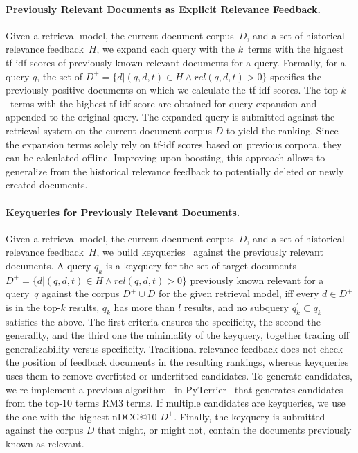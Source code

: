 \paragraph{Previously Relevant Documents as Explicit Relevance Feedback.} Given a retrieval model, the current document corpus~$D$, and a set of historical relevance feedback~$H$, we expand each query with the $k$~terms with the highest tf-idf scores of previously known relevant documents for a query. Formally, for a query $q$, the set of $D^{+} = \{d| (q,d,t) \in H \wedge rel(q,d,t) > 0\}$ specifies the previously positive documents on which we calculate the tf-idf scores. The top $k$~terms with the highest tf-idf score are obtained for query expansion and appended to the original query. The expanded query is submitted against the retrieval system on the current document corpus $D$ to yield the ranking. Since the expansion terms solely rely on tf-idf scores based on  previous corpora, they can be calculated offline. Improving upon boosting, this approach allows to generalize from the historical relevance feedback to potentially deleted or newly created documents. 


\paragraph{Keyqueries for Previously Relevant Documents.} Given a retrieval model, the current document corpus~$D$, and a set of historical relevance feedback~$H$, we build keyqueries~\cite{froebe:2021c,gollub:2013a,hagen:2016b} against the previously relevant documents. A query $q_{k}$ is a keyquery for the set of target documents $D^{+} = \{d| (q,d,t) \in H \wedge rel(q,d,t) > 0\}$ previously known relevant for a query~$q$ against the corpus $D^{+} \cup D$ for the given retrieval model, iff \Ni every $d \in D^{+}$ is in the top-$k$ results, \Nii $q_{k}$ has more than $l$ results, and \Niii no subquery $q^{'}_{k} \subset q_{k}$ satisfies the above. The first criteria ensures the specificity, the second the generality, and the third one the minimality of the keyquery, together trading off generalizability versus specificity. Traditional relevance feedback does not check the position of feedback documents in the resulting rankings, whereas keyqueries uses them to remove overfitted or underfitted candidates. To generate candidates, we re-implement a previous algorithm~\cite{froebe:2022c} in PyTerrier~\cite{macdonald:2020} that generates candidates from the top-10 terms RM3 terms. If multiple candidates are keyqueries, we use the one with the highest nDCG@10 $D^{+}$. Finally, the keyquery is submitted against the corpus $D$ that might, or might not, contain the documents previously known as relevant.

